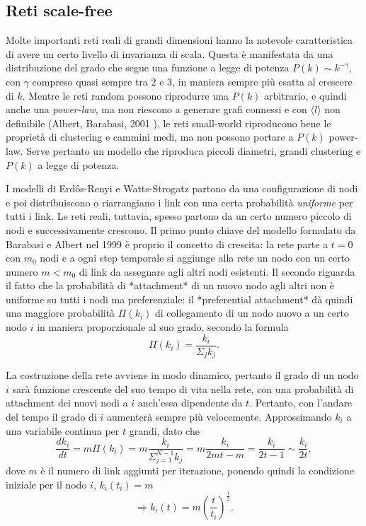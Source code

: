 \subsection{Reti scale-free} 
Molte importanti reti reali di grandi dimensioni hanno la notevole caratteristica di avere un certo livello di invarianza di scala. Questa è manifestata da una distribuzione del grado che segue una funzione a legge di potenza $P(k)\sim k^{-\gamma}$, con $\gamma$ compreso quasi sempre tra $2$ e $3$, in maniera sempre più esatta al crescere di $k$. Mentre le reti random possono riprodurre una $P(k)$ arbitrario, e quindi anche una \emph{power-law}, ma non riescono a generare grafi connessi e con $\langle l \rangle$ non definibile (Albert, Barabasi, 2001 
), le reti small-world riproducono bene le proprietà di clustering e cammini medi, ma non possono portare a $P(k)$ power-law. Serve pertanto un modello che riproduca piccoli diametri, grandi clustering e $P(k)$ a legge di potenza.

I modelli di Erdős-Renyi e Watts-Strogatz partono da una configurazione di nodi e poi distribuiscono o riarrangiano i link con una certa probabilità \emph{uniforme} per tutti i link. Le reti reali, tuttavia, spesso partono da un certo numero piccolo di nodi e successivamente crescono. Il primo punto chiave del modello formulato da Barabasi e Albert nel 1999
è proprio il concetto di crescita: la rete parte a $t=0$ con $m_0$ nodi e a ogni step temporale si aggiunge alla rete un nodo con un certo numero $m < m_0$ di link da assegnare agli altri nodi esistenti. Il secondo riguarda il fatto che la probabilità di *attachment* di un nuovo nodo agli altri non è uniforme su tutti i nodi ma preferenziale: il *preferential attachment* dà quindi una maggiore probabilità $\Pi (k_i)$ di collegamento di un nodo nuovo a un certo nodo $i$ in maniera proporzionale al suo grado, secondo la formula
\[\Pi (k_i) = \frac{k_i}{\Sigma_j k_j}.\]

La costruzione della rete avviene in modo dinamico, pertanto il grado di un nodo $i$ sarà funzione crescente del suo tempo di vita nella rete, con una probabilità di attachment dei nuovi nodi a $i$ anch'essa dipendente da $t$. Pertanto, con l'andare del tempo il grado di $i$ aumenterà sempre più velocemente. Approssimando $k_i$ a una variabile continua per $t$ grandi, dato che 
\[\frac{dk_i}{dt} = m \Pi (k_i) = m \frac{k_i}{\Sigma_{j=1}^{N-1} k_j} = m \frac{k_i}{2mt - m} = \frac{k_i}{2t - 1} \sim \frac{k_i}{2t},\]
dove $m$ è il numero di link aggiunti per iterazione, ponendo quindi la condizione iniziale per il nodo $i$, $k_i(t_i) = m$
\[ \Rightarrow k_i(t) = m (\frac{t}{t_i})^\frac{1}{2}. \]

